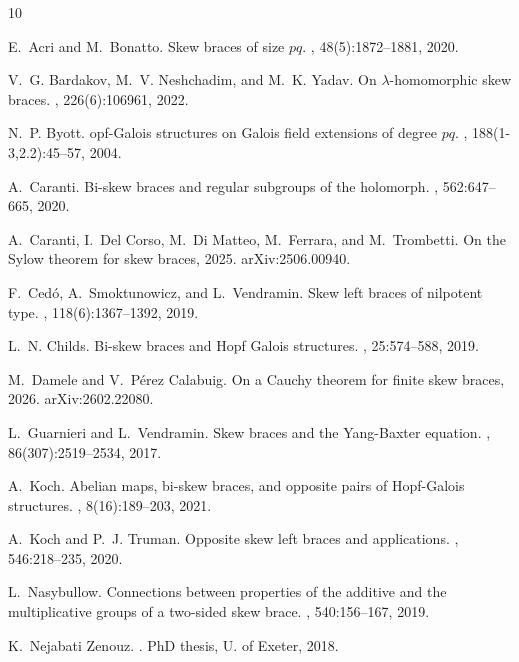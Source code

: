 \documentclass[12pt,a4paper, reqno]{amsart}
\theoremstyle{definition}
\begin{document}

\begin{thebibliography}{10}

E.~Acri and M.~Bonatto.
\newblock Skew braces of size $pq$.
, 48(5):1872--1881, 2020.

V.~G. Bardakov, M.~V. Neshchadim, and M.~K. Yadav.
\newblock On $ \lambda $-homomorphic skew braces.
, 226(6):106961, 2022.

N.~P. Byott.
opf-{G}alois structures on {G}alois field extensions of degree
  $pq$.
, 188(1-3,2.2):45--57, 2004.

A.~Caranti.
\newblock Bi-skew braces and regular subgroups of the holomorph.
, 562:647--665, 2020.

A.~Caranti, I.~Del Corso, M.~Di Matteo, M.~Ferrara, and M.~Trombetti.
\newblock On the {S}ylow theorem for skew braces, 2025.
\newblock arXiv:2506.00940.

F.~Ced\'{o}, A.~Smoktunowicz, and L.~Vendramin.
\newblock Skew left braces of nilpotent type.
, 118(6):1367--1392, 2019.

L.~N. Childs.
\newblock Bi-skew braces and {H}opf {G}alois structures.
, 25:574--588, 2019.

M.~Damele and V.~Pérez Calabuig.
\newblock On a {C}auchy theorem for finite skew braces, 2026.
\newblock arXiv:2602.22080.

L.~Guarnieri and L.~Vendramin.
\newblock Skew braces and the {Y}ang-{B}axter equation.
, 86(307):2519--2534, 2017.

A.~Koch.
\newblock Abelian maps, bi-skew braces, and opposite pairs of {H}opf-{G}alois
  structures.
, 8(16):189--203, 2021.

A.~Koch and P.~J. Truman.
\newblock Opposite skew left braces and applications.
, 546:218--235, 2020.

L.~Nasybullow.
\newblock Connections between properties of the additive and the multiplicative
  groups of a two-sided skew brace.
, 540:156--167, 2019.

K.~{Nejabati Zenouz}.
.
\newblock PhD thesis, U. of Exeter, 2018.


\end{thebibliography}
\end{document}
